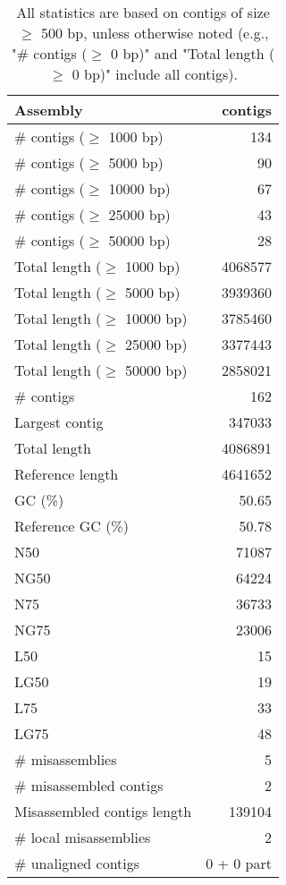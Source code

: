 \documentclass[12pt,a4paper]{article}
\begin{document}
\begin{table}[ht]
\begin{center}
\caption{All statistics are based on contigs of size $\geq$ 500 bp, unless otherwise noted (e.g., "\# contigs ($\geq$ 0 bp)" and "Total length ($\geq$ 0 bp)" include all contigs).}
\begin{tabular}{|l*{1}{|r}|}
\hline
Assembly & contigs \\ \hline
\# contigs ($\geq$ 1000 bp) & 134 \\ \hline
\# contigs ($\geq$ 5000 bp) & 90 \\ \hline
\# contigs ($\geq$ 10000 bp) & 67 \\ \hline
\# contigs ($\geq$ 25000 bp) & 43 \\ \hline
\# contigs ($\geq$ 50000 bp) & 28 \\ \hline
Total length ($\geq$ 1000 bp) & 4068577 \\ \hline
Total length ($\geq$ 5000 bp) & 3939360 \\ \hline
Total length ($\geq$ 10000 bp) & 3785460 \\ \hline
Total length ($\geq$ 25000 bp) & 3377443 \\ \hline
Total length ($\geq$ 50000 bp) & 2858021 \\ \hline
\# contigs & 162 \\ \hline
Largest contig & 347033 \\ \hline
Total length & 4086891 \\ \hline
Reference length & 4641652 \\ \hline
GC (\%) & 50.65 \\ \hline
Reference GC (\%) & 50.78 \\ \hline
N50 & 71087 \\ \hline
NG50 & 64224 \\ \hline
N75 & 36733 \\ \hline
NG75 & 23006 \\ \hline
L50 & 15 \\ \hline
LG50 & 19 \\ \hline
L75 & 33 \\ \hline
LG75 & 48 \\ \hline
\# misassemblies & 5 \\ \hline
\# misassembled contigs & 2 \\ \hline
Misassembled contigs length & 139104 \\ \hline
\# local misassemblies & 2 \\ \hline
\# unaligned contigs & 0 + 0 part \\ \hline

\end{tabular}
\end{center}
\end{table}
\end{document}
